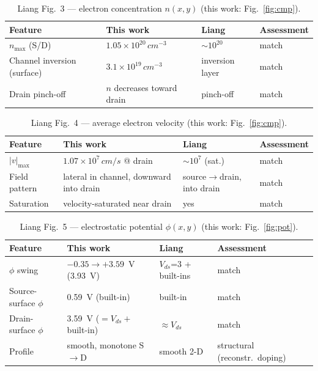 \documentclass[11pt]{article}
\begin{document}
\begin{table}[h]\centering\small
\caption{Liang Fig.~3 --- electron concentration $n(x,y)$ (this work: Fig.~\ref{fig:cmp}).}\label{tab:f3}
\begin{tabular}{p{3.5cm}p{3.9cm}p{2.9cm}p{3.2cm}}
\toprule
Feature & This work & Liang & Assessment \\
\midrule
$n_{\max}$ (S/D) & $1.05\times10^{20}\,\si{cm^{-3}}$ & $\sim\!10^{20}$ & match \\
Channel inversion (surface) & $3.1\times10^{19}\,\si{cm^{-3}}$ & inversion layer & match \\
Drain pinch-off & $n$ decreases toward drain & pinch-off & match \\
\bottomrule
\end{tabular}
\end{table}

\begin{table}[h]\centering\small
\caption{Liang Fig.~4 --- average electron velocity (this work: Fig.~\ref{fig:cmp}).}\label{tab:f4}
\begin{tabular}{p{3.5cm}p{3.9cm}p{2.9cm}p{3.2cm}}
\toprule
Feature & This work & Liang & Assessment \\
\midrule
$|v|_{\max}$ & $1.07\times10^{7}\,\si{cm/s}$ @ drain & $\sim\!10^{7}$ (sat.) & match \\
Field pattern & lateral in channel, downward into drain & source$\to$drain, into drain & match \\
Saturation & velocity-saturated near drain & yes & match \\
\bottomrule
\end{tabular}
\end{table}

\begin{table}[h]\centering\small
\caption{Liang Fig.~5 --- electrostatic potential $\phi(x,y)$ (this work: Fig.~\ref{fig:pot}).}\label{tab:f5}
\begin{tabular}{p{3.5cm}p{3.9cm}p{2.9cm}p{3.2cm}}
\toprule
Feature & This work & Liang & Assessment \\
\midrule
$\phi$ swing & $-0.35\to+3.59$~V (3.93~V) & $V_{ds}$=3 + built-ins & match \\
Source-surface $\phi$ & \SI{0.59}{V} (built-in) & built-in & match \\
Drain-surface $\phi$ & \SI{3.59}{V} ($=V_{ds}+$built-in) & $\approx\!V_{ds}$ & match \\
Profile & smooth, monotone S$\to$D & smooth 2-D & structural (reconstr.\ doping) \\
\bottomrule
\end{tabular}
\end{table}
\end{document}
